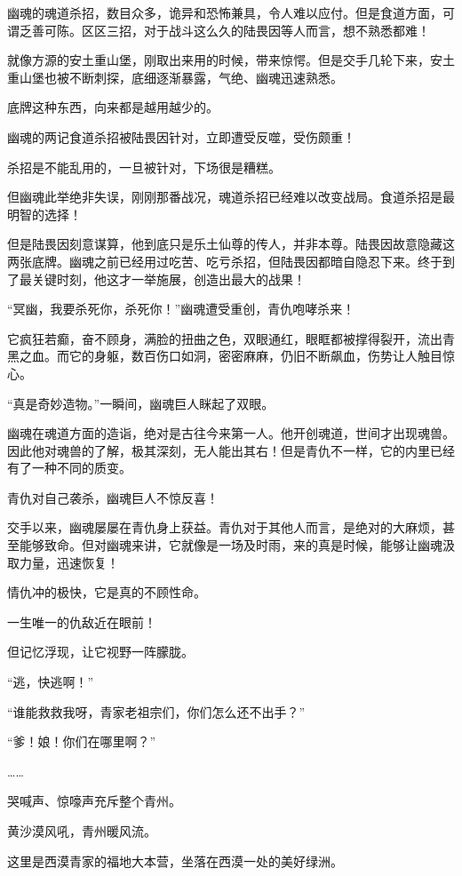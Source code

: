 \begin{this_body}
幽魂的魂道杀招，数目众多，诡异和恐怖兼具，令人难以应付。但是食道方面，可谓乏善可陈。区区三招，对于战斗这么久的陆畏因等人而言，想不熟悉都难！

就像方源的安土重山堡，刚取出来用的时候，带来惊愕。但是交手几轮下来，安土重山堡也被不断刺探，底细逐渐暴露，气绝、幽魂迅速熟悉。

底牌这种东西，向来都是越用越少的。

幽魂的两记食道杀招被陆畏因针对，立即遭受反噬，受伤颇重！

杀招是不能乱用的，一旦被针对，下场很是糟糕。

但幽魂此举绝非失误，刚刚那番战况，魂道杀招已经难以改变战局。食道杀招是最明智的选择！

但是陆畏因刻意谋算，他到底只是乐土仙尊的传人，并非本尊。陆畏因故意隐藏这两张底牌。幽魂之前已经用过吃苦、吃亏杀招，但陆畏因都暗自隐忍下来。终于到了最关键时刻，他这才一举施展，创造出最大的战果！

“冥幽，我要杀死你，杀死你！”幽魂遭受重创，青仇咆哮杀来！

它疯狂若癫，奋不顾身，满脸的扭曲之色，双眼通红，眼眶都被撑得裂开，流出青黑之血。而它的身躯，数百伤口如洞，密密麻麻，仍旧不断飙血，伤势让人触目惊心。

“真是奇妙造物。”一瞬间，幽魂巨人眯起了双眼。

幽魂在魂道方面的造诣，绝对是古往今来第一人。他开创魂道，世间才出现魂兽。因此他对魂兽的了解，极其深刻，无人能出其右！但是青仇不一样，它的内里已经有了一种不同的质变。

青仇对自己袭杀，幽魂巨人不惊反喜！

交手以来，幽魂屡屡在青仇身上获益。青仇对于其他人而言，是绝对的大麻烦，甚至能够致命。但对幽魂来讲，它就像是一场及时雨，来的真是时候，能够让幽魂汲取力量，迅速恢复！

情仇冲的极快，它是真的不顾性命。

一生唯一的仇敌近在眼前！

但记忆浮现，让它视野一阵朦胧。

“逃，快逃啊！”

“谁能救救我呀，青家老祖宗们，你们怎么还不出手？”

“爹！娘！你们在哪里啊？”

……

哭喊声、惊嚎声充斥整个青州。

黄沙漠风吼，青州暖风流。

这里是西漠青家的福地大本营，坐落在西漠一处的美好绿洲。


\end{this_body}
